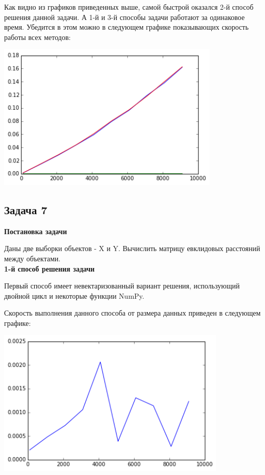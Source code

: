 \documentclass[12pt, a4paper]{article}
\begin{document}
				Как видно из графиков приведенных выше, самой быстрой оказался 2-й способ решения данной задачи. А 1-й и 3-й способы задачи работают за одинаковое время. Убедится в этом можно в следующем графике показывающих скорость работы всех методов:
				\begin{center}
					\includegraphics[height=7cm]{timeit/num6_ti123.png}
				\end{center}



		\newpage
		\subsection{Задача 7}

			{\bf Постановка задачи\\}

				Даны две выборки объектов - X и Y. Вычислить матрицу евклидовых расстояний между объектами. \\

			{\bf 1-й способ решения задачи\\}

				Первый способ имеет невектаризованный вариант решения, использующий двойной цикл и некоторые функции NumPy.

				Скорость выполнения данного способа от размера данных приведен в следующем графике:
				\begin{center}
					\includegraphics[height=7cm]{timeit/num7_ti1.png}
				\end{center}
\end{document}
